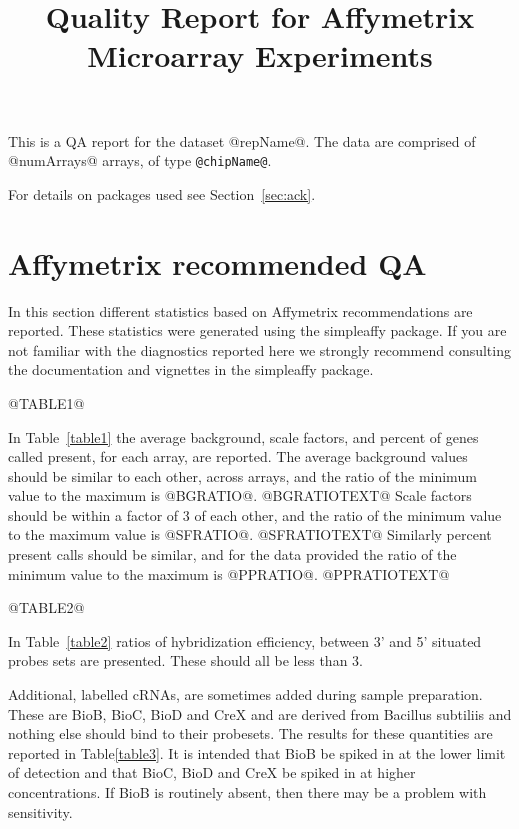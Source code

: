\documentclass[11pt]{article}
\newcommand{\Rpackage}[1]{{\textsf{#1}}}
\begin{document}
\title{Quality Report for Affymetrix Microarray Experiments}

\maketitle

This is a QA report for the dataset @repName@.
The data are comprised of @numArrays@ arrays, of type \verb+@chipName@+.

For details on packages used see Section~\ref{sec:ack}.

\section{Affymetrix recommended QA}

In this section different statistics based on Affymetrix recommendations
are reported. These statistics were generated using the \Rpackage{simpleaffy} 
package. If you are not familiar with the diagnostics reported here we
strongly recommend consulting the documentation and vignettes in the
\Rpackage{simpleaffy} package.

@TABLE1@


In Table~\ref{table1} the average background, scale 
factors, and percent of genes called present, for each array, are reported.  
The average background values should 
be similar to each other, across arrays, and the
ratio of the minimum value to the maximum is @BGRATIO@.  @BGRATIOTEXT@
Scale factors should be within a factor of 3 of each other, and the
ratio of the minimum value to the maximum value is @SFRATIO@.  @SFRATIOTEXT@
Similarly percent present calls should be similar, and for the data
provided the ratio of the minimum value to the maximum is @PPRATIO@.  @PPRATIOTEXT@

@TABLE2@

In Table~\ref{table2} ratios of hybridization efficiency, between 3' and
5' situated probes sets are presented. These should all be less than 3.

Additional, labelled cRNAs, are sometimes added during sample preparation. 
These are BioB, BioC, BioD and CreX and are derived from Bacillus subtiliis 
and nothing else should bind to their probesets. The results for these
quantities are reported in Table\ref{table3}. It is intended that BioB be spiked
in at the lower limit of detection and that BioC, BioD and CreX be
spiked in at higher concentrations. If BioB is routinely absent, then there
may be a problem with sensitivity.
\end{document}
